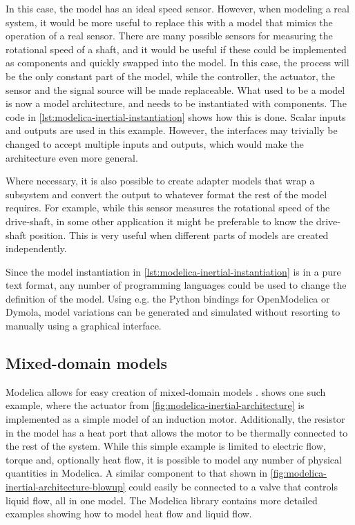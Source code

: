 \documentclass[\rootfolder/main.tex]{subfiles}
\begin{document}
In this case, the model has an ideal speed sensor. 
However, when modeling a real system, it would be more useful to replace this with a model that mimics the operation of a real sensor.
There are many possible sensors for measuring the rotational speed of a shaft, and it would be useful if these could be implemented as components and quickly swapped into the model.
In this case, the process will be the only constant part of the model, while the controller, the actuator, the sensor and the signal source will be made replaceable.
What used to be a model is now a model architecture, and needs to be instantiated with components.
The code in \cref{lst:modelica-inertial-instantiation} shows how this is done.
Scalar inputs and outputs are used in this example.
However, the interfaces may trivially be changed to accept multiple inputs and outputs, which would make the architecture even more general.

Where necessary, it is also possible to create adapter models that wrap a subsystem and convert the output to whatever format the rest of the model requires.
For example, while this sensor measures the rotational speed of the drive-shaft, in some other application it might be preferable to know the drive-shaft position.
This is very useful when different parts of models are created independently.

Since the model instantiation in \cref{lst:modelica-inertial-instantiation} is in a pure text format, any number of programming languages could be used to change the definition of the model.
Using e.g. the Python bindings for OpenModelica or Dymola, model variations can be generated and simulated without resorting to manually using a graphical interface.

\subsection{Mixed-domain models}

Modelica allows for easy creation of mixed-domain models \cite{clauss2002}.
 shows one such example, where the actuator from \cref{fig:modelica-inertial-architecture} is implemented as a simple model of an induction motor.
Additionally, the resistor in the model has a heat port that allows the motor to be thermally connected to the rest of the system.
While this simple example is limited to electric flow, torque and, optionally heat flow, it is possible to model any number of physical quantities in Modelica.
A similar component to that shown in \cref{fig:modelica-inertial-architecture-blowup} could easily be connected to a valve that controls liquid flow, all in one model.
The Modelica library contains more detailed examples showing how to model heat flow\footnotemark{}
and liquid flow\footnotemark{}.
\end{document}
